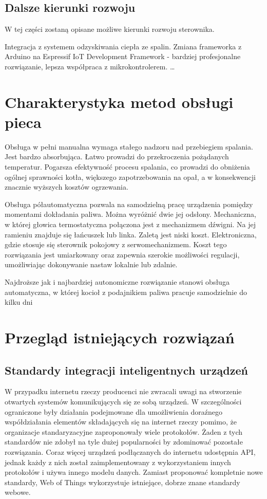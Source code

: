 \documentclass[11pt]{report}
\begin{document}
 \section{Dalsze kierunki rozwoju}
 W tej części zostaną opisane możliwe kierunki rozwoju sterownika.
 
 Integracja z systemem odzyskiwania ciepła ze spalin.
 Zmiana frameworka z Arduino na Espressif IoT Development Framework - bardziej profesjonalne rozwiązanie, lepsza współpraca z mikrokontrolerem.
 \ldots
 

 \chapter{Charakterystyka metod obsługi pieca} 
 Obsługa w pełni manualna wymaga stałego nadzoru nad przebiegiem spalania. Jest bardzo absorbująca. Łatwo prowadzi do przekroczenia pożądanych temperatur. Pogarsza efektywność procesu spalania, co prowadzi do obniżenia ogólnej sprawności kotła, większego zapotrzebowania na opał, a w konsekwencji znacznie wyższych kosztów ogrzewania.
 
 Obsługa półautomatyczna pozwala na samodzielną pracę urządzenia pomiędzy momentami dokładania paliwa. Można wyróżnić dwie jej odsłony. Mechaniczna, w której głowica termostatyczna połączona jest z mechanizmem dźwigni. Na jej ramieniu znajduje się łańcuszek lub linka. Zaletą jest niski koszt. Elektroniczna, gdzie stosuje się sterownik pokojowy z serwomechanizmem. Koszt tego rozwiązania jest umiarkowany oraz zapewnia szerokie możliwości regulacji, umożliwiając dokonywanie nastaw lokalnie lub zdalnie. 
 
 Najdroższe jak i najbardziej autonomiczne rozwiązanie stanowi obsługa automatyczna, w której kocioł z podajnikiem paliwa pracuje samodzielnie do kilku dni
 
 
 \chapter{Przegląd istniejących rozwiązań} 
 \section{Standardy integracji inteligentnych urządzeń}
 W przypadku internetu rzeczy producenci nie zwracali uwagi na stworzenie otwartych systemów komunikujących się ze sobą urządzeń. W szczególności ograniczone były działania  podejmowane dla umożliwienia doraźnego współdziałania elementów składających się na internet rzeczy pomimo, że organizacje standaryzacyjne zaproponowały wiele protokołów. Żaden z tych standardów nie zdobył na tyle dużej popularności by zdominować pozostałe rozwiązania. Coraz więcej urządzeń podłączanych do internetu udostępnia API, jednak każdy z nich został zaimplementowany z wykorzystaniem innych protokołów i używa innego modelu danych. Zamiast proponować kompletnie nowe standardy, Web of Things wykorzystuje istniejące, dobrze znane standardy webowe.
  
\end{document}
